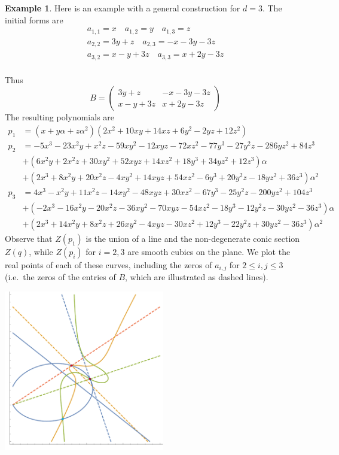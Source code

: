 \documentclass[a4paper,11pt]{amsart}%
\newcommand\pmat[1]{\begin{pmatrix} #1 \end{pmatrix}}
\theoremstyle{definition}
\newtheorem{exam}[theorem]{Example}
\begin{document}
\begin{exam}\label{gconst_deg3}
Here is an example with a general construction for $d=3$. The initial forms are 
\begin{align*}
a_{1,1}=x \quad a_{1,2}=y \quad a_{1,3}=z  \\
a_{2,2}=3y+z \quad a_{2,3}=-x-3y-3z  \\
a_{3,2}=x-y+3z \quad a_{3,3}=x+2y-3z \\
\end{align*}

Thus 
$$
B = \pmat{3y+z& -x-3y-3z\\ x-y+3z& x+2y-3z} 
$$
The resulting polynomials are
{\tiny
\begin{align*}
p_1 &= (x+y\alpha+z\alpha^2)(2x^2+10xy+14xz+6y^2-2yz+12z^2)\\
p_2 &= -5x^3-23x^2y+x^2z-59xy^2-12xyz-72xz^2-77y^3-27y^2z-286yz^2+84z^3\\
&+(6x^2y+2x^2z+30xy^2+52xyz+14xz^2+18y^3+34yz^2+12z^3)\alpha \\
&+(2x^3+8x^2y+20x^2z-4xy^2+14xyz+54xz^2-6y^3+20y^2z-18yz^2+36z^3)\alpha^2\\
p_3 &= 4x^3-x^2y+11x^2z-14xy^2-48xyz+30xz^2-67y^3-25y^2z-200yz^2+104z^3\\
&+(-2x^3-16x^2y-20x^2z-36xy^2-70xyz-54xz^2-18y^3-12y^2z-30yz^2-36z^3)\alpha\\
&+(2x^3+14x^2y+8x^2z+26xy^2-4xyz-30xz^2+12y^3-22y^2z+30yz^2-36z^3)\alpha^2
\end{align*}
}
Observe that $Z(p_1)$ is the union of a line and the non-degenerate conic section $Z(q)$, while  $Z(p_i)$ for $i=2,3$ are smooth cubics on the 
plane. We plot the real points of each of these 
curves, including the zeros of $a_{i,j}$ for $2\le i,j \le 3$ (i.e.\ the zeros of the entries of $B$, which are illustrated as dashed lines).

\begin{center}
\includegraphics[width=7cm]{degree_3_example.pdf}
\end{center}


\end{exam}
\end{document}
